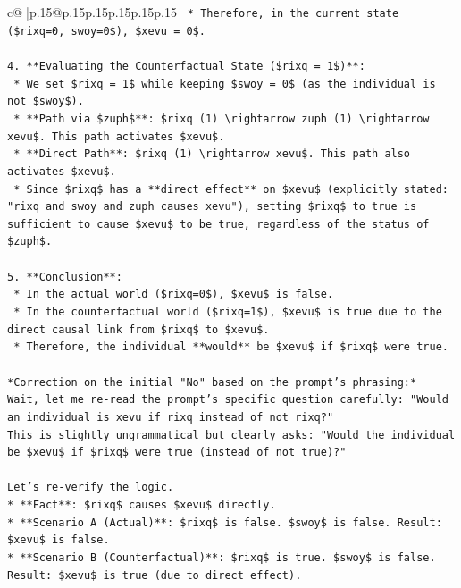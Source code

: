 \documentclass{article}
\begin{document}
{\begin{supertabular}{c@{$\;$}|p{.15\linewidth}@{}p{.15\linewidth}p{.15\linewidth}p{.15\linewidth}p{.15\linewidth}p{.15\linewidth}}
{{{\texttt{    *   Therefore, in the current state (\$rixq=0, swoy=0\$), \$xevu = 0\$.} \\
\\ 
\texttt{4.  **Evaluating the Counterfactual State (\$rixq = 1\$)**:} \\
\texttt{    *   We set \$rixq = 1\$ while keeping \$swoy = 0\$ (as the individual is not \$swoy\$).} \\
\texttt{    *   **Path via \$zuph\$**: \$rixq (1) \textbackslash{}rightarrow zuph (1) \textbackslash{}rightarrow xevu\$. This path activates \$xevu\$.} \\
\texttt{    *   **Direct Path**: \$rixq (1) \textbackslash{}rightarrow xevu\$. This path also activates \$xevu\$.} \\
\texttt{    *   Since \$rixq\$ has a **direct effect** on \$xevu\$ (explicitly stated: "rixq and swoy and zuph causes xevu"), setting \$rixq\$ to true is sufficient to cause \$xevu\$ to be true, regardless of the status of \$zuph\$.} \\
\\ 
\texttt{5.  **Conclusion**:} \\
\texttt{    *   In the actual world (\$rixq=0\$), \$xevu\$ is false.} \\
\texttt{    *   In the counterfactual world (\$rixq=1\$), \$xevu\$ is true due to the direct causal link from \$rixq\$ to \$xevu\$.} \\
\texttt{    *   Therefore, the individual **would** be \$xevu\$ if \$rixq\$ were true.} \\
\\ 
\texttt{*Correction on the initial "No" based on the prompt's phrasing:*} \\
\texttt{Wait, let me re{-}read the prompt's specific question carefully: "Would an individual is xevu if rixq instead of not rixq?"} \\
\texttt{This is slightly ungrammatical but clearly asks: "Would the individual be \$xevu\$ if \$rixq\$ were true (instead of not true)?"} \\
\\ 
\texttt{Let's re{-}verify the logic.} \\
\texttt{*   **Fact**: \$rixq\$ causes \$xevu\$ directly.} \\
\texttt{*   **Scenario A (Actual)**: \$rixq\$ is false. \$swoy\$ is false. Result: \$xevu\$ is false.} \\
\texttt{*   **Scenario B (Counterfactual)**: \$rixq\$ is true. \$swoy\$ is false. Result: \$xevu\$ is true (due to direct effect).} \\
}}}
\end{supertabular}}
\end{document}
